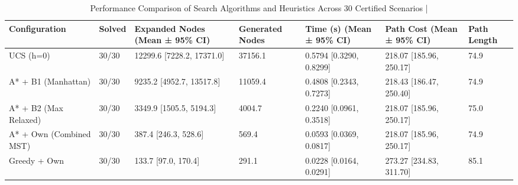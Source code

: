 \begin{table}[htbp]
\centering
\caption{Performance Comparison of Search Algorithms and Heuristics Across 30 Certified Scenarios | \stampline}
\label{tab:partB_heuristics}
\begin{tabular}{lllllll}
\toprule
Configuration & Solved & Expanded Nodes (Mean ± 95\% CI) & Generated Nodes & Time (s) (Mean ± 95\% CI) & Path Cost (Mean ± 95\% CI) & Path Length \\
\midrule
UCS (h=0) & 30/30 & 12299.6 [7228.2, 17371.0] & 37156.1 & 0.5794 [0.3290, 0.8299] & 218.07 [185.96, 250.17] & 74.9 \\
A* + B1 (Manhattan) & 30/30 & 9235.2 [4952.7, 13517.8] & 11059.4 & 0.4808 [0.2343, 0.7273] & 218.43 [186.47, 250.40] & 74.9 \\
A* + B2 (Max Relaxed) & 30/30 & 3349.9 [1505.5, 5194.3] & 4004.7 & 0.2240 [0.0961, 0.3518] & 218.07 [185.96, 250.17] & 75.0 \\
A* + Own (Combined MST) & 30/30 & 387.4 [246.3, 528.6] & 569.4 & 0.0593 [0.0369, 0.0817] & 218.07 [185.96, 250.17] & 74.9 \\
Greedy + Own & 30/30 & 133.7 [97.0, 170.4] & 291.1 & 0.0228 [0.0164, 0.0291] & 273.27 [234.83, 311.70] & 85.1 \\
\bottomrule
\end{tabular}

\end{table}
